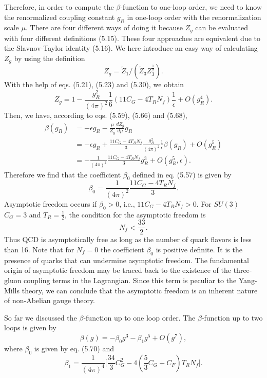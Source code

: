 Therefore, in order to compute the $\beta$-function to one-loop order, we need to know the renormalized coupling constant $g_R$ in one-loop order with the renormalization scale $\mu$. There are four different ways of doing it because $Z_g$ can be evaluated with four different definitions (5.15). These four approaches are equivalent due to the Slavnov-Taylor identity (5.16). We here introduce an easy way of calculating $Z_g$ by using the definition 
\begin{equation}
Z_g=\widetilde{Z}_1/(\widetilde{Z}_3Z_3^\frac{1}{2}).
\end{equation}
With the help of eqs. (5.21), (5.23) and (5.30), we obtain
\begin{equation}
Z_g=1-\frac{g_R^2}{(4\pi)^2}\frac{1}{6}(11C_G-4T_RN_f)\frac{1}{\epsilon}+O(g_R^4).
\end{equation} 
Then, we have, according to eqs. (5.59), (5.66) and (5.68),
\begin{align}
\beta(g_R)&=-\epsilon g_R-\frac{\mu}{Z_g}\frac{dZ_g}{d\mu}g_R\nonumber\\
&=-\epsilon g_R+\frac{11C_G-4T_RN_f}{3}\frac{g^2_R}{(4\pi)^2}\frac{1}{\epsilon}\beta(g_R)+O(g_R^5)\nonumber\\
&=-\frac{1}{(4\pi)^2}\frac{11C_G-4T_RN_f}{3}g^3_R+O(g^5_R,\epsilon).
\end{align}
Therefore we find that the coefficient $\beta_0$ defined in eq. (5.57) is given by
\begin{equation}
\beta_0=\frac{1}{(4\pi)^2}\frac{11C_G-4T_RN_f}{3}.
\end{equation}
Asymptotic freedom occurs if $\beta_0>0$, i.e., $11C_G-4T_RN_f>0$. For $SU(3)$ $C_G=3$ and $T_R=\frac{1}{2}$, the condition for the asymptotic freedom is
\begin{equation}
N_f<\frac{33}{2}.
\end{equation}
Thus QCD is asymptotically free as long as the number of quark flavors is less than 16. Note that for $N_f=0$ the coefficient $\beta_0$ is positive definite. It is the presence of quarks that can undermine asymptotic freedom. The fundamental origin of asymptotic freedom may be traced back to the existence of the three-gluon coupling terms in the Lagrangian. Since this term is peculiar to the Yang-Mills theory, we can conclude that the asymptotic freedom is an inherent nature of non-Abelian gauge theory.

So far we discussed the $\beta$-function up to one loop order. The $\beta$-function up to two loops \cite{Cas74,Jon74} is given by
\begin{equation}
\beta(g)=-\beta_0g^3-\beta_1g^5+O(g^7),
\end{equation}
where $\beta_0$ is given by eq. (5.70) and
\begin{equation}
\beta_1=\frac{1}{(4\pi)^4}\biggl[ \frac{34}{3}C_G^2-4\left( \frac{5}{3}C_G+C_F \right)T_RN_f \biggr].
\end{equation}

